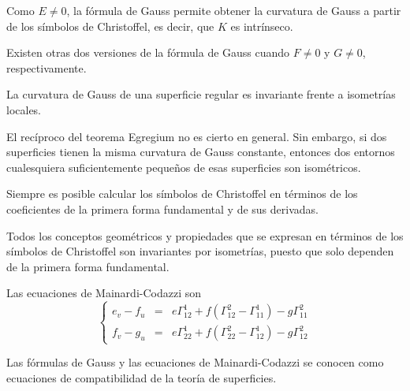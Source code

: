 \begin{remark}
    Como $E \neq 0$, la fórmula de Gauss permite obtener la curvatura de Gauss a partir de los símbolos de Christoffel, es decir, que $K$ es intrínseco.
\end{remark}

\begin{note}
    Existen otras dos versiones de la fórmula de Gauss cuando $F \neq 0$ y $G \neq 0$, respectivamente.
\end{note}

\begin{theorem}
    La curvatura de Gauss de una superficie regular es invariante frente a isometrías locales.
\end{theorem}

\begin{remark}
    El recíproco del teorema Egregium no es cierto en general.
    Sin embargo, si dos superficies tienen la misma curvatura de Gauss constante, entonces dos entornos cualesquiera suficientemente pequeños de esas superficies son isométricos.
\end{remark}

\begin{note}
    Siempre es posible calcular los símbolos de Christoffel en términos de los coeficientes de la primera forma fundamental y de sus derivadas.
\end{note}

\begin{remark}
    Todos los conceptos geométricos y propiedades que se expresan en términos de los símbolos de Christoffel son invariantes por isometrías, puesto que solo dependen de la primera forma fundamental.
\end{remark}

\begin{proposition}
    Las ecuaciones de Mainardi-Codazzi son
    $$\left\{
        \begin{array}{lcl}
            e_v - f_u & = & e\Gamma^1_{12} + f(\Gamma^2_{12} - \Gamma^1_{11}) - g\Gamma^2_{11} \\
            f_v - g_u & = & e\Gamma^1_{22} + f(\Gamma^2_{22} - \Gamma^1_{12}) - g\Gamma^2_{12}
        \end{array}
        \right.$$
\end{proposition}

\begin{note}
    Las fórmulas de Gauss y las ecuaciones de Mainardi-Codazzi se conocen como ecuaciones de compatibilidad de la teoría de superficies.
\end{note}

